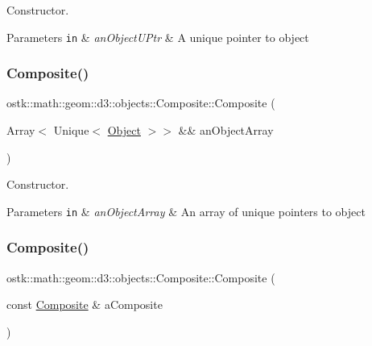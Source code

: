Constructor. 


\begin{DoxyParams}[1]{Parameters}
\mbox{\tt in}  & {\em an\+Object\+U\+Ptr} & A unique pointer to object \\
\hline
\end{DoxyParams}
\mbox{\label{classostk_1_1math_1_1geom_1_1d3_1_1objects_1_1_composite_a936bd3f9d4a6ba02b91ba47c61361b21}} 
\subsubsection{\texorpdfstring{Composite()}{Composite()}\hspace{0.1cm}{\footnotesize\ttfamily [3/4]}}
{\footnotesize\ttfamily ostk\+::math\+::geom\+::d3\+::objects\+::\+Composite\+::\+Composite (\begin{DoxyParamCaption}\item[{Array$<$ Unique$<$ \hyperlink{classostk_1_1math_1_1geom_1_1d3_1_1_object}{Object} $>$$>$ \&\&}]{an\+Object\+Array }\end{DoxyParamCaption})\hspace{0.3cm}{\ttfamily [explicit]}}



Constructor. 


\begin{DoxyParams}[1]{Parameters}
\mbox{\tt in}  & {\em an\+Object\+Array} & An array of unique pointers to object \\
\hline
\end{DoxyParams}
\mbox{\label{classostk_1_1math_1_1geom_1_1d3_1_1objects_1_1_composite_a8682632cf01c97cf9b6e621c8e6ce5db}} 
\subsubsection{\texorpdfstring{Composite()}{Composite()}\hspace{0.1cm}{\footnotesize\ttfamily [4/4]}}
{\footnotesize\ttfamily ostk\+::math\+::geom\+::d3\+::objects\+::\+Composite\+::\+Composite (\begin{DoxyParamCaption}\item[{const \hyperlink{classostk_1_1math_1_1geom_1_1d3_1_1objects_1_1_composite}{Composite} \&}]{a\+Composite }\end{DoxyParamCaption})}



